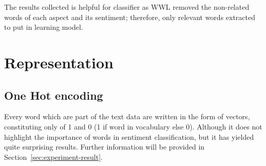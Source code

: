 The results collected is helpful for classifier as WWL removed the non-related words of each aspect and its sentiment; therefore, only relevant words extracted to put in learning model.

\section{Representation}
\subsection{One Hot encoding}
Every word which are part of the text data are written in the form of vectors, constituting only of 1 and 0 (1 if word in vocabulary else 0). Although it does not highlight the importance of words in sentiment classification, but it has yielded quite surprising results. Further information will be provided in Section~\ref{sec:experiment-result}.




